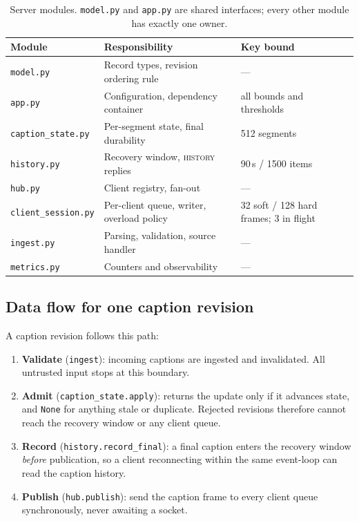 \documentclass[11pt,a4paper]{article}
\begin{document}
\begin{table}[h]
\centering\small
\begin{tabular}{@{}lll@{}}
\toprule
\textbf{Module} & \textbf{Responsibility} & \textbf{Key bound} \\
\midrule
\texttt{model.py}          & Record types, revision ordering rule & --- \\
\texttt{app.py}            & Configuration, dependency container  & all bounds and thresholds \\
\texttt{caption\_state.py} & Per-segment state, final durability  & 512 segments \\
\texttt{history.py}        & Recovery window, \textsc{history} replies & 90\,s / 1500 items \\
\texttt{hub.py}            & Client registry, fan-out             & --- \\
\texttt{client\_session.py}& Per-client queue, writer, overload policy & 32 soft / 128 hard frames; 3 in flight \\
\texttt{ingest.py}         & Parsing, validation, source handler  & --- \\
\texttt{metrics.py}        & Counters and observability           & --- \\
\bottomrule
\end{tabular}
\caption{Server modules. \texttt{model.py} and \texttt{app.py} are shared
interfaces; every other module has exactly one owner.}
\end{table}


\subsection{Data flow for one caption revision}

A caption revision follows this path:

\begin{enumerate}
\item \textbf{Validate} (\texttt{ingest}): incoming captions are ingested and invalidated. All untrusted input stops
      at this boundary.
\item \textbf{Admit} (\texttt{caption\_state.apply}): returns the
      update only if it advances state, and \texttt{None} for anything
      stale or duplicate. Rejected revisions therefore cannot reach the
      recovery window or any client queue.
\item \textbf{Record} (\texttt{history.record\_final}): a final caption enters
      the recovery window \emph{before} publication, so a client
      reconnecting within the same event-loop can read the caption history.
\item \textbf{Publish} (\texttt{hub.publish}): send the caption frame to
      every client queue synchronously, never awaiting a socket.
\end{enumerate}
\end{document}
